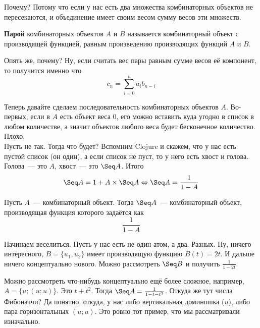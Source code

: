 \documentclass{article}
\begin{document}
    \begin{remark}
        Почему? Потому что если у нас есть два множества комбинаторных объектов не пересекаются, и объединение имеет своим весом сумму весов эти множеств.
    \end{remark}
    \begin{definition}
        \textbf{Парой} комбинаторных объектов $A$ и $B$ называется комбинаторный объект с производящей функцией, равным произведению производящих функций $A$ и $B$.
    \end{definition}
    \begin{remark}
        Опять же, почему? Ну, если считать вес пары равным сумме весов её компонент, то получится именно что
        $$c_n=\sum\limits_{i=0}^na_ib_{n-i}$$
    \end{remark}
    \begin{remark}
        Теперь давайте сделаем последовательность комбинаторных объектов $A$. Во-первых, если в $A$ есть объект веса 0, его можно вставить куда угодно в список в любом количестве, а значит объектов любого веса будет бесконечное количество. Плохо.\\
        Пусть не так. Тогда что будет? Вспомним Clojure и скажем, что у нас есть пустой список (он один), а если список не пуст, то у него есть хвост и голова. Голова~--- это $A$, хвост~--- это $\Seq A$. Итого
        $$
        \Seq A=1+A\times\Seq A\Leftrightarrow\Seq A=\frac1{1-A}
        $$
    \end{remark}
    \begin{definition}
        Пусть $A$~--- комбинаторный объект. Тогда $\Seq A$~--- комбинаторный объект, производящая функция которого задаётся как
        $$
        \frac1{1-A}
        $$ 
    \end{definition}
    \begin{example}
        Начинаем веселиться. Пусть у нас есть не один атом, а два. Разных. Ну, ничего интересного, $B=\{u_1,u_2\}$ имеет производящую функцию $B(t)=2t$. И дальше ничего концептуально нового. Можно рассмотреть $\Seq B$ и получить $\frac1{1-2t}$.
    \end{example}
    \begin{example}
        Можно рассмотреть что-нибудь концептуально ещё более сложное, например, $A=\{u;(u;u)\}$. Это $t+t^2$. Тогда $\Seq A=\frac1{1-t-t^2}$. Откуда же тут числа Фибоначчи? Да понятно, откуда, у нас либо вертикальная доминошка ($u$), либо пара горизонтальных $(u;u)$. Это ровно тот пример, что мы рассматривали изначально.
    \end{example}
\end{document}
